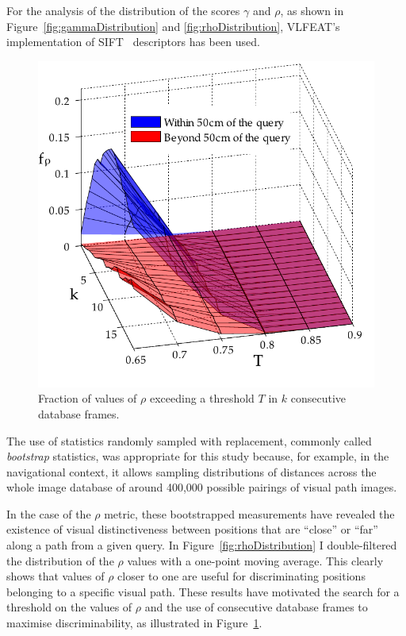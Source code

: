 For the analysis of the distribution of the scores $\gamma$ and $\rho$, as shown in Figure~\ref{fig:gammaDistribution} and \ref{fig:rhoDistribution}, VLFEAT's~\cite{Vedaldi2008} implementation of SIFT~\cite{lowe2004distinctive} descriptors has been used.

\begin{figure}
\begin{center}
\includegraphics[width=.8\linewidth]{./gfx/Chapter02/C1twoTestWithBootstrapping2.pdf}
\caption{Fraction of values of $\rho$ exceeding a threshold $T$ in $k$ consecutive database frames.}
\label{fig:rocTwoParametersC5}
\end{center}
\end{figure}

The use of statistics randomly sampled with replacement, commonly called \textit{bootstrap} statistics, was appropriate for this study because, for example, in the navigational context, it allows sampling distributions of distances across the whole image database of around 400,000 possible pairings of visual path images.

In the case of the $\rho$ metric, these bootstrapped measurements have revealed the existence of visual distinctiveness between positions that are ``close'' or ``far'' along a path from a given query. In Figure~\ref{fig:rhoDistribution} I double-filtered the distribution of the $\rho$ values with a one-point moving average. This clearly shows that values of $\rho$ closer to one are useful for discriminating positions belonging to a specific visual path. These results have motivated the search for a threshold on the values of $\rho$ and the use of consecutive database frames to maximise discriminability, as illustrated in Figure~\ref{fig:rocTwoParametersC5}.


